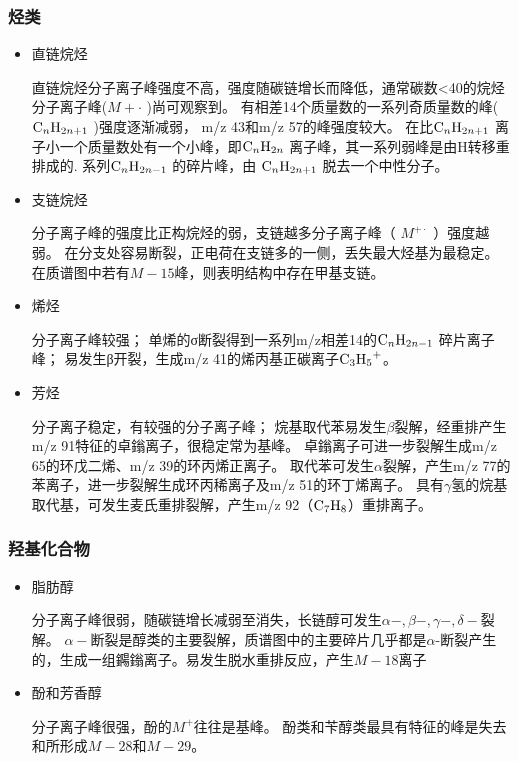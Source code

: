 \subsubsection*{烃类}
\begin{itemize}
    \item 直链烷烃
    
    直链烷烃分子离子峰强度不高，强度随碳链增长而降低，通常碳数<40的烷烃分子离子峰($M+\cdot$ )尚可观察到。
    有相差14个质量数的一系列奇质量数的峰($\ce{C_{n}H_{2n+1}}$ )强度逐渐减弱， m/z 43和m/z 57的峰强度较大。
    在比$\ce{C_{n}H_{2n+1}}$ 离子小一个质量数处有一个小峰，即$\ce{C_{n}H_{2n}}$ 离子峰，其一系列弱峰是由H转移重排成的.
    系列$\ce{C_{n}H_{2n-1}}$ 的碎片峰，由 $\ce{C_{n}H_{2n+1}}$ 脱去一个中性分子。
    \item 支链烷烃
    
    分子离子峰的强度比正构烷烃的弱，支链越多分子离子峰（ $M^{+\cdot}$ ）强度越弱。
    在分支处容易断裂，正电荷在支链多的一侧，丢失最大烃基为最稳定。在质谱图中若有$M-15$峰，则表明结构中存在甲基支链。
    \item 烯烃
    
    分子离子峰较强；
    单烯的σ断裂得到一系列m/z相差14的$\ce{C_{n}H_{2n-1}}$ 碎片离子峰；
    易发生β开裂，生成m/z 41的烯丙基正碳离子$\ce{C_{3}H_{5}^{+}}$。
    \item 芳烃
    
    分子离子稳定，有较强的分子离子峰；
    烷基取代苯易发生$\beta$裂解，经重排产生m/z 91特征的卓鎓离子，很稳定常为基峰。
    卓鎓离子可进一步裂解生成m/z 65的环戊二烯、m/z 39的环丙烯正离子。
    取代苯可发生$\alpha$裂解，产生m/z 77的苯离子，进一步裂解生成环丙稀离子及m/z 51的环丁烯离子。
    具有$\gamma$氢的烷基取代基，可发生麦氏重排裂解，产生m/z 92（$\ce{C_{7}H_{8}}$）重排离子。
\end{itemize}

\subsubsection*{ 羟基化合物}
\begin{itemize}
    \item 脂肪醇

    分子离子峰很弱，随碳链增长减弱至消失，长链醇可发生$\alpha-,\beta-,\gamma-,\delta-$裂解。
    $\alpha-$断裂是醇类的主要裂解，质谱图中的主要碎片几乎都是$\alpha$-断裂产生的，生成一组鐊鎓离子。易发生脱水重排反应，产生$M-18$离子
    \item 酚和芳香醇
    
    分子离子峰很强，酚的$M^{+}$往往是基峰。
酚类和苄醇类最具有特征的峰是失去和所形成$M-28$和$M-29$。
\end{itemize}

